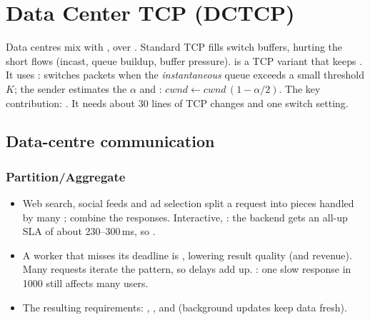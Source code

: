 \chapter{Data Center TCP (DCTCP)}

\begin{keybox}
Data centres mix  with , over . Standard TCP fills switch buffers, hurting the short flows (incast, queue buildup, buffer pressure).  is a TCP variant that keeps . It uses : switches  packets when the \emph{instantaneous} queue exceeds a small threshold $K$; the sender estimates the  $\alpha$ and : $cwnd \leftarrow cwnd\,(1-\alpha/2)$. The key contribution: . It needs about 30 lines of TCP changes and one switch setting.
\end{keybox}

\section{Data-centre communication}
\subsection{Partition/Aggregate}
\begin{itemize}
\item Web search, social feeds and ad selection split a request into pieces handled by many ;  combine the responses. Interactive, : the backend gets an all-up SLA of about 230--300\,ms, so .
\item A worker that misses its deadline is , lowering result quality (and revenue). Many requests iterate the pattern, so delays add up. : one slow response in 1000 still affects many users.
\item The resulting requirements: , , and  (background updates keep data fresh).
\end{itemize}

